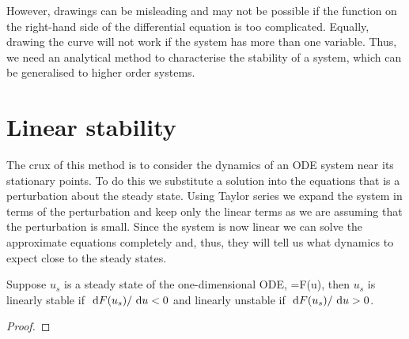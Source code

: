 However, drawings can be misleading and may not be possible if the function on the right-hand side of the differential equation is too complicated. Equally, drawing the curve will not work if the system has more than one variable. Thus, we need an analytical method to characterise the stability of a system, which can be generalised to higher order systems.

\section{Linear stability}
The crux of this method is to consider the dynamics of an ODE system near its stationary points. To do this we substitute a solution into the equations that is a perturbation about the steady state. Using Taylor series we expand the system in terms of the perturbation and keep only the linear terms as we are assuming that the perturbation is small. Since the system is now linear we can solve the approximate equations completely and, thus, they will tell us what dynamics to expect close to the steady states.
\begin{thm}\label{Stability_theorem}
Suppose $u_s$ is a steady state of the one-dimensional ODE,
\bb
{}=F(u),\label{General_ODE}
\ee
then $u_s$ is linearly stable if $\text{ d} F(u_s)/\text{ d} u<0$ and linearly unstable if $\text{ d} F(u_s)/\text{ d} u>0$.
\end{thm}
\begin{proof}
\end{proof}
